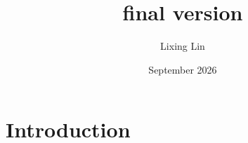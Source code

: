 \documentclass{article}
\title{final version}
\author{Lixing Lin}
\date{September 2026}
\begin{document}
\maketitle

\section{Introduction}
\end{document}
